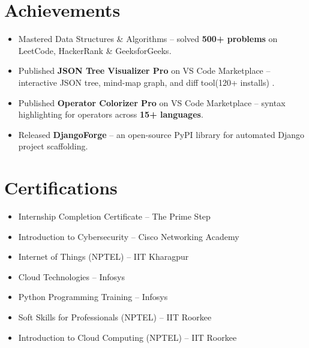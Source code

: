 \documentclass[10pt, a4paper]{article}
\begin{document}
\section*{Achievements}

\begin{itemize}
  \item Mastered Data Structures \& Algorithms -- solved \textbf{500+ problems} on LeetCode, HackerRank \& GeeksforGeeks.
  \item Published \textbf{JSON Tree Visualizer Pro} on VS Code Marketplace -- interactive JSON tree, mind-map graph, and diff tool(120+ installs) .
  \item Published \textbf{Operator Colorizer Pro} on VS Code Marketplace -- syntax highlighting for operators across \textbf{15+ languages}.
  \item Released \textbf{DjangoForge} -- an open-source PyPI library for automated Django project scaffolding.
\end{itemize}

\section*{Certifications}

\begin{itemize}
  \item Internship Completion Certificate -- The Prime Step
  \item Introduction to Cybersecurity -- Cisco Networking Academy
  \item Internet of Things (NPTEL) -- IIT Kharagpur
  \item Cloud Technologies -- Infosys
  \item Python Programming Training -- Infosys
  \item Soft Skills for Professionals (NPTEL) -- IIT Roorkee
  \item Introduction to Cloud Computing (NPTEL) -- IIT Roorkee
\end{itemize}
\end{document}
